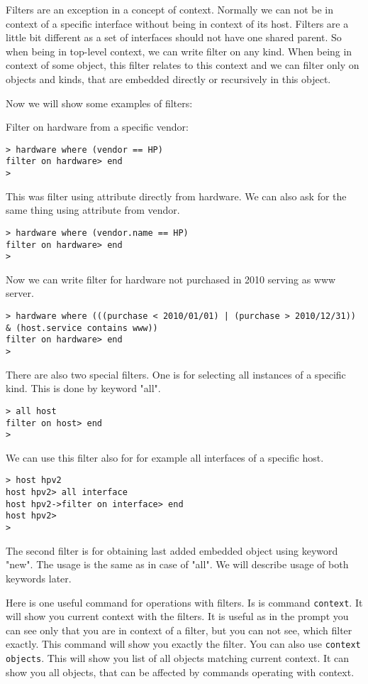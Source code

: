 \documentclass[deska]{subfiles}
\begin{document}
Filters are an exception in a concept of context. Normally we can not be in context of a specific interface without being
in context of its host. Filters are a little bit different as a set of interfaces should not have one shared parent. So
when being in top-level context, we can write filter on any kind. When being in context of some object, this filter
relates to this context and we can filter only on objects and kinds, that are embedded directly or recursively in this object.

Now we will show some examples of filters:

Filter on hardware from a specific vendor:
\begin{verbatim}
> hardware where (vendor == HP)
filter on hardware> end
>
\end{verbatim}

This was filter using attribute directly from hardware. We can also ask for the same thing using attribute from vendor.
\begin{verbatim}
> hardware where (vendor.name == HP)
filter on hardware> end
>
\end{verbatim}

Now we can write filter for hardware not purchased in 2010 serving as www server.

\begin{verbatim}
> hardware where (((purchase < 2010/01/01) | (purchase > 2010/12/31)) & (host.service contains www))
filter on hardware> end
>
\end{verbatim}

There are also two special filters. One is for selecting all instances of a specific kind. This is done by keyword "all".
\begin{verbatim}
> all host
filter on host> end
>
\end{verbatim}

We can use this filter also for for example all interfaces of a specific host.
\begin{verbatim}
> host hpv2
host hpv2> all interface
host hpv2->filter on interface> end
host hpv2>
>
\end{verbatim}

The second filter is for obtaining last added embedded object using keyword "new". The usage is the same as in case of
"all". We will describe usage of both keywords later.

Here is one useful command for operations with filters. Is is command {\tt context}. It will show you current context
with the filters. It is useful as in the prompt you can see only that you are in context of a filter, but you can not
see, which filter exactly. This command will show you exactly the filter. You can also use {\tt context objects}. This
will show you list of all objects matching current context. It can show you all objects, that can be affected by commands
operating with context.
\end{document}
